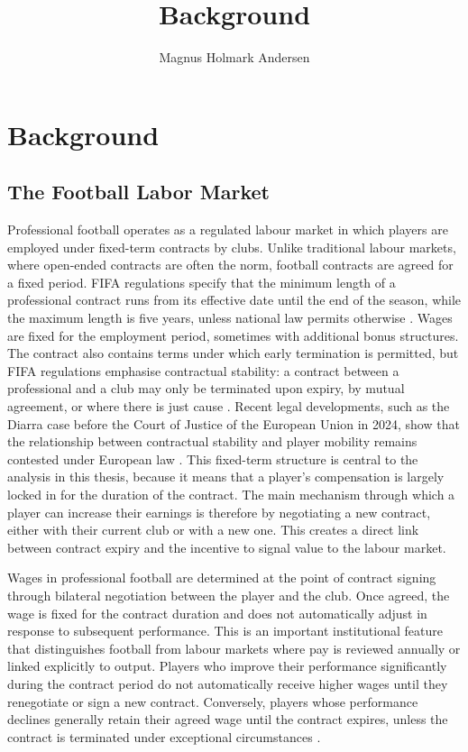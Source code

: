 \documentclass{article}
\title{Background}
\author{Magnus Holmark Andersen}
\begin{document}
\maketitle







\section{Background}

\subsection{The Football Labor Market}

Professional football operates as a regulated labour market in which players are employed under fixed-term contracts by clubs. Unlike traditional labour markets, where open-ended contracts are often the norm, football contracts are agreed for a fixed period. FIFA regulations specify that the minimum length of a professional contract runs from its effective date until the end of the season, while the maximum length is five years, unless national law permits otherwise \citep{fifa_rstp_2025}. Wages are fixed for the employment period, sometimes with additional bonus structures. The contract also contains terms under which early termination is permitted, but FIFA regulations emphasise contractual stability: a contract between a professional and a club may only be terminated upon expiry, by mutual agreement, or where there is just cause \citep{fifa_rstp_2025}. Recent legal developments, such as the Diarra case before the Court of Justice of the European Union in 2024, show that the relationship between contractual stability and player mobility remains contested under European law \citep{cjeu_diarra_2024}. This fixed-term structure is central to the analysis in this thesis, because it means that a player's compensation is largely locked in for the duration of the contract. The main mechanism through which a player can increase their earnings is therefore by negotiating a new contract, either with their current club or with a new one. This creates a direct link between contract expiry and the incentive to signal value to the labour market. \

Wages in professional football are determined at the point of contract signing through bilateral negotiation between the player and the club. Once agreed, the wage is fixed for the contract duration and does not automatically adjust in response to subsequent performance. This is an important institutional feature that distinguishes football from labour markets where pay is reviewed annually or linked explicitly to output. Players who improve their performance significantly during the contract period do not automatically receive higher wages until they renegotiate or sign a new contract. Conversely, players whose performance declines generally retain their agreed wage until the contract expires, unless the contract is terminated under exceptional circumstances \citep{fifa_rstp_2025}. \
\end{document}
